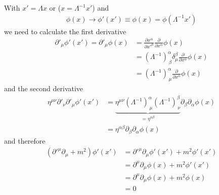 \documentclass[../main.tex]{subfiles}
\begin{document}
With $x'=\Lambda x$ or ($x=\Lambda^{-1}x'$) and
\begin{align}
\phi(x)\rightarrow\phi'(x')\equiv\phi(x)=\phi(\Lambda^{-1}x')
\end{align}
we need to calculate the first derivative
\begin{align}
\partial'_\mu\phi'(x')
=\partial'_\mu\phi(x)
&=\frac{\partial x^\alpha}{\partial x'^\mu}\frac{\partial}{\partial x^\alpha}\phi(x)\\
&=(\Lambda^{-1})^\alpha_{\,\beta}\delta^\beta_\mu\frac{\partial}{\partial x^\alpha}\phi(x)\\
&=(\Lambda^{-1})^\alpha_{\,\mu}\frac{\partial}{\partial x^\alpha}\phi(x)
\end{align}
and the second derivative
\begin{align}
\eta^{\mu\nu}\partial'_\nu\partial'_\mu\phi'(x')
&=\underbrace{\eta^{\mu\nu}(\Lambda^{-1})^\alpha_{\,\mu}(\Lambda^{-1})^\beta_{\,\nu}}_{=\eta^{\alpha\beta}}\partial_\beta\partial_\alpha\phi(x)\\
&=\eta^{\alpha\beta}\partial_\beta\partial_\alpha\phi(x)
\end{align}
and therefore
\begin{align}
(\partial'^\mu\partial_\mu+m^2)\phi'(x')
&=\partial'^\mu\partial_\mu\phi'(x')+m^2\phi'(x')\\
&=\partial^\mu\partial_\mu\phi(x)+m^2\phi'(x')\\
&=\partial^\mu\partial_\mu\phi(x)+m^2\phi(x)\\
&=0
\end{align}
\end{document}
